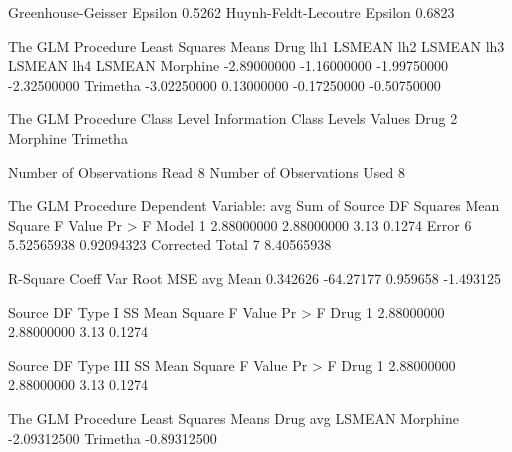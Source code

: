 \documentclass{article}
\begin{document}
\begin{Woutput}
Greenhouse-Geisser Epsilon      0.5262
Huynh-Feldt-Lecoutre Epsilon    0.6823

The GLM Procedure
Least Squares Means
Drug          lh1 LSMEAN      lh2 LSMEAN      lh3 LSMEAN      lh4 LSMEAN
Morphine     -2.89000000     -1.16000000     -1.99750000     -2.32500000
Trimetha     -3.02250000      0.13000000     -0.17250000     -0.50750000

The GLM Procedure
         Class Level Information
Class         Levels    Values
Drug               2    Morphine Trimetha

Number of Observations Read           8
Number of Observations Used           8

The GLM Procedure
Dependent Variable: avg
                                    Sum of
Source                    DF       Squares   Mean Square  F Value  Pr > F
Model                      1    2.88000000    2.88000000     3.13  0.1274
Error                      6    5.52565938    0.92094323
Corrected Total            7    8.40565938

R-Square     Coeff Var      Root MSE      avg Mean
0.342626     -64.27177      0.959658     -1.493125

Source                    DF     Type I SS   Mean Square  F Value  Pr > F
Drug                       1    2.88000000    2.88000000     3.13  0.1274

Source                    DF   Type III SS   Mean Square  F Value  Pr > F
Drug                       1    2.88000000    2.88000000     3.13  0.1274

The GLM Procedure
Least Squares Means
Drug          avg LSMEAN
Morphine     -2.09312500
Trimetha     -0.89312500
\end{Woutput}
\end{document}
